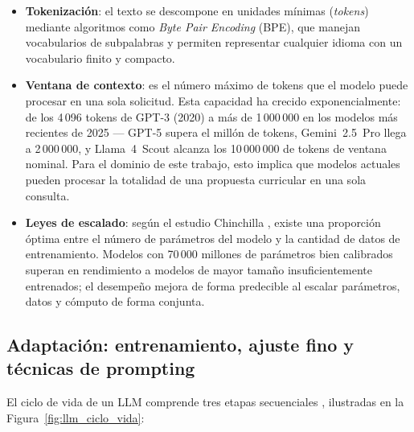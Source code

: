 \begin{itemize}
  \item \textbf{Tokenización}: el texto se descompone en unidades mínimas (\textit{tokens}) mediante algoritmos como \textit{Byte Pair Encoding} (BPE), que manejan vocabularios de subpalabras y permiten representar cualquier idioma con un vocabulario finito y compacto.

  \item \textbf{Ventana de contexto}: es el número máximo de tokens que el modelo puede procesar en una sola solicitud. Esta capacidad ha crecido exponencialmente: de los 4\,096 tokens de GPT-3 (2020) a más de 1\,000\,000 en los modelos más recientes de 2025 --- GPT-5 supera el millón de tokens, Gemini~2.5~Pro llega a 2\,000\,000, y Llama~4~Scout alcanza los 10\,000\,000 de tokens de ventana nominal. Para el dominio de este trabajo, esto implica que modelos actuales pueden procesar la totalidad de una propuesta curricular en una sola consulta.

  \item \textbf{Leyes de escalado}: según el estudio Chinchilla \citep{garcia2025desarrollo}, existe una proporción óptima entre el número de parámetros del modelo y la cantidad de datos de entrenamiento. Modelos con 70\,000 millones de parámetros bien calibrados superan en rendimiento a modelos de mayor tamaño insuficientemente entrenados; el desempeño mejora de forma predecible al escalar parámetros, datos y cómputo de forma conjunta.
\end{itemize}

\subsection{Adaptación: entrenamiento, ajuste fino y técnicas de prompting}

El ciclo de vida de un LLM comprende tres etapas secuenciales \citep{torres2024desarrollo}, ilustradas en la Figura~\ref{fig:llm_ciclo_vida}:

